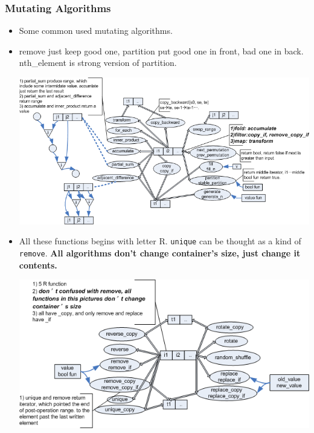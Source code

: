 \documentclass[a4paper,11pt,twoside]{book}
\begin{document}
\subsubsection{Mutating Algorithms}
\begin{itemize}
	\item Some common used mutating algorithms.
	\item remove just keep good one, partition put good one in front, bad one in back. nth\_element is strong version of partition.
	\begin{center}
		\includegraphics[width=0.85\linewidth]{pics/stl2.png}
	\end{center}
	
	\item All these functions begins with letter R. \texttt{unique} can be thought as a kind of \texttt{remove}.\textbf{ All algorithms don't change container's size, just change it contents.}
	\begin{center}
	\includegraphics[width=0.85\linewidth]{pics/std3.png}
	\end{center}
	
\end{itemize}
	
	
\end{document}

